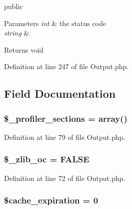 public 
\begin{DoxyParams}{Parameters}
{\em int} & the status code \\
\hline
{\em string} & \\
\hline
\end{DoxyParams}
\begin{DoxyReturn}{Returns}
void 
\end{DoxyReturn}


Definition at line 247 of file Output.\-php.



\subsection{Field Documentation}
\subsubsection[{\$\-\_\-profiler\-\_\-sections}]{\setlength{\rightskip}{0pt plus 5cm}\$\-\_\-profiler\-\_\-sections = array()\hspace{0.3cm}{\ttfamily [protected]}}\label{class_c_i___output_a4d239124375bbbdb9a4f5a0260505c40}


Definition at line 79 of file Output.\-php.

\subsubsection[{\$\-\_\-zlib\-\_\-oc}]{\setlength{\rightskip}{0pt plus 5cm}\$\-\_\-zlib\-\_\-oc = F\-A\-L\-S\-E\hspace{0.3cm}{\ttfamily [protected]}}\label{class_c_i___output_a76d91b71069ec82a31b4d12643e0ca40}


Definition at line 72 of file Output.\-php.

\subsubsection[{\$cache\-\_\-expiration}]{\setlength{\rightskip}{0pt plus 5cm}\$cache\-\_\-expiration = 0\hspace{0.3cm}{\ttfamily [protected]}}\label{class_c_i___output_a4a65b5005fdb96d5bdac5d642a022f16}


